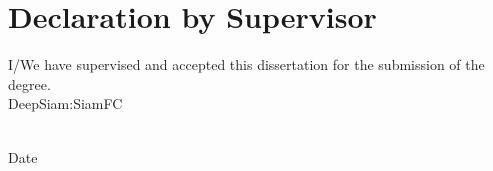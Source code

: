 \chapter*{Declaration by Supervisor}

\begin{flushleft}
	I/We have supervised and accepted this dissertation for the submission of the degree. \\
DeepSiam:SiamFC
	\vspace{15mm}
	
	{\makebox[6.5cm]{\dotfill}} \hfill {\makebox[5cm]{\dotfill}}  \\ 
	\supervisorA \hfill Date \\
	
	
	
	
\end{flushleft}
